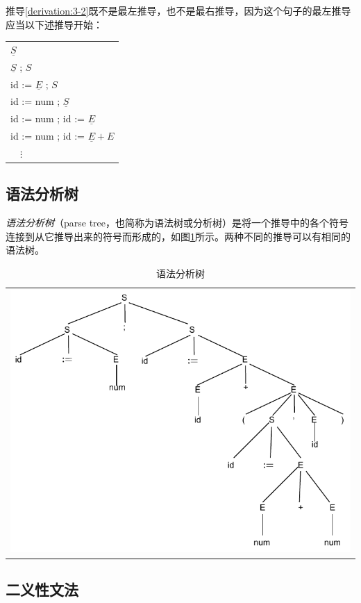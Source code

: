 \documentclass[cn,11pt,chinese]{elegantbook}
\begin{document}
推导\ref{derivation:3-2}既不是最左推导，也不是最右推导，因为这个句子的最左推导应当以下述推导开始：

\begin{center}
\begin{tabular}{l}
  $\underline{S}$ \\
  $\underline{S}$ ; $S$ \\
  id := $\underline{E}$ ; $S$ \\
  id := num ; $\underline{S}$ \\
  id := num ; id := $\underline{E}$ \\
  id := num ; id := $\underline{E} + E$ \\
  $\quad\vdots$ \\
\end{tabular}
\end{center}

\subsection{语法分析树}

\textit{语法分析树}（parse tree，也简称为语法树或分析树）是将一个推导中的各个符号连接到从它推导出来的符号而形成的，如图\ref{fig:3-3}所示。两种不同的推导可以有相同的语法树。

\renewcommand\tablename{图}
\begin{table}[htbp]
  \centering
  \begin{tabular}{l}
  \includegraphics[width=.8\textwidth]{3-3.pdf}
  \end{tabular}
  \caption{语法分析树}
  \label{fig:3-3}
\end{table}
\renewcommand\tablename{表}

\subsection{二义性文法}
\end{document}
